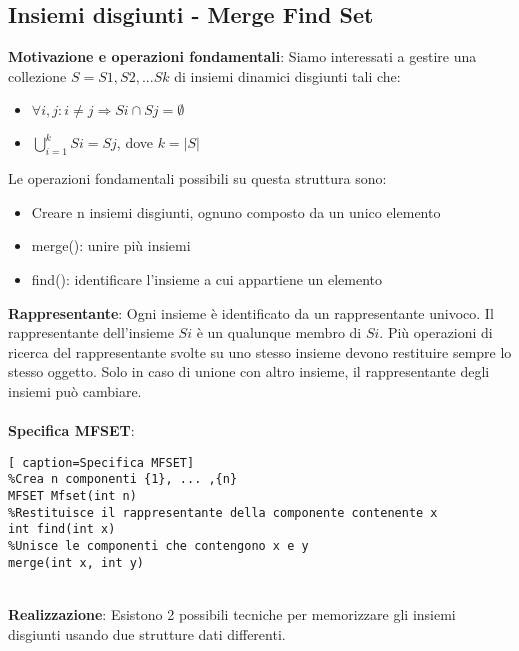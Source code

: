 \documentclass[../cheatSheetAlgoritmi.tex]{subfiles}
\begin{document}
\subsection{Insiemi disgiunti - Merge Find Set}
\textbf{Motivazione e operazioni fondamentali}: Siamo interessati a gestire una collezione $S = {S1, S2, ...Sk}$ di insiemi dinamici disgiunti tali che: 
\begin{itemize}
	\item $\forall i,j : i \neq j \Rightarrow Si \cap Sj = \emptyset$ 
	\item $\bigcup\limits_{i=1}^{k} Si = Sj$, dove $k =|S|$
\end{itemize}
Le operazioni fondamentali possibili su questa struttura sono:
\begin{itemize}
	\item Creare n insiemi disgiunti, ognuno composto da un unico elemento
	\item merge(): unire più insiemi
	\item find(): identificare l'insieme a cui appartiene un elemento\\
\end{itemize}
\textbf{Rappresentante}: Ogni insieme è identificato da un rappresentante univoco. Il rappresentante dell'insieme $Si$ è un qualunque membro di $Si$. Più operazioni di ricerca del rappresentante svolte su uno stesso insieme devono restituire sempre lo stesso oggetto. Solo in caso di unione con altro insieme, il rappresentante degli insiemi può cambiare.\\\\
\textbf{Specifica MFSET}:
\begin{lstlisting}[ caption=Specifica MFSET]
%Crea n componenti {1}, ... ,{n}
MFSET Mfset(int n)
%Restituisce il rappresentante della componente contenente x
int find(int x)
%Unisce le componenti che contengono x e y
merge(int x, int y)
\end{lstlisting}
\textbf{\\Realizzazione}: Esistono 2 possibili tecniche per memorizzare gli insiemi disgiunti usando due strutture dati differenti.\\
\end{document}
